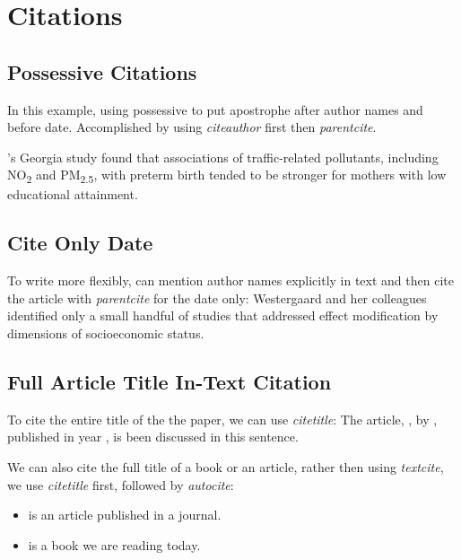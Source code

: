 \documentclass[12pt,english]{article}
\begin{document}
\section{Citations}
\subsection{Possessive Citations}

In this example, using possessive to put apostrophe after author names and before date. Accomplished by using \emph{citeauthor} first then \emph{parentcite}.

\citeauthor{hao_air_2016}'s \parencite*{hao_air_2016} Georgia study
found that associations of traffic-related pollutants, including NO\textsubscript{2} and
PM\textsubscript{2.5}, with preterm birth tended to be stronger for mothers with low
educational attainment.

\subsection{Cite Only Date}

To write more flexibly, can mention author names explicitly in text and then cite the article with \emph{parentcite} for the date only: Westergaard and her colleagues \parencite*{westergaard_ambient_2017} identified only a small handful of studies that addressed effect modification by dimensions of socioeconomic status.


\subsection{Full Article Title In-Text Citation}

To cite the entire title of the the paper, we can use \emph{citetitle}: The article, , by \citeauthor{conti_understanding_2010}, published in year \cite*{conti_understanding_2010}, is been discussed in this sentence.

We can also cite the full title of a book or an article, rather then using \emph{textcite}, we use \emph{citetitle} first, followed by \emph{autocite}:
\begin{itemize}
    \item {} \autocite{conti_understanding_2010} is an article published in a journal.
    \item {} \autocite{becker_human_1994} is a book we are reading today.
\end{itemize}
\end{document}
